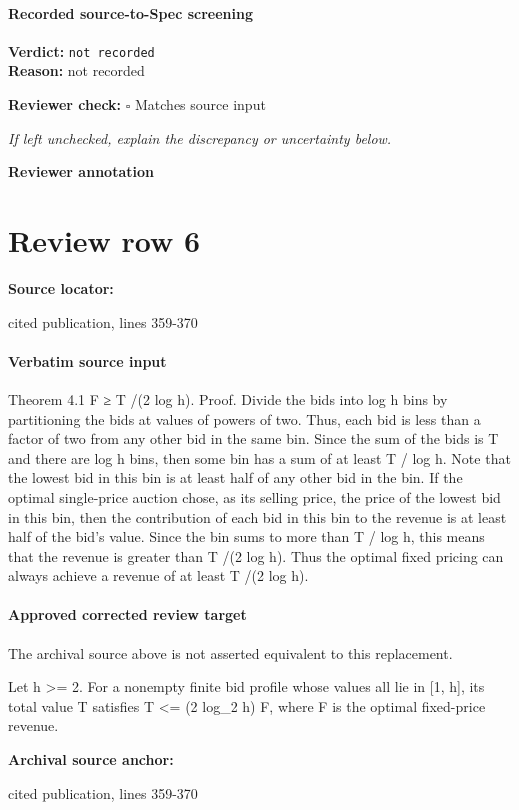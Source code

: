 \documentclass[10pt]{article}
\newcommand{\reviewerbox}{%
  \par\noindent\fbox{\parbox{0.96\linewidth}{\rule{0pt}{0.38in}}}\par
}
\newcommand{\reviewmatch}[1]{%
  \par\noindent\textbf{Reviewer check:} $\square$\; #1\par
  \noindent\emph{If left unchecked, explain the discrepancy or uncertainty below.}\par
}
\begin{document}
\paragraph{Recorded source-to-Spec screening}
\textbf{Verdict:} \texttt{not recorded}
\\
\textbf{Reason:} not recorded
\reviewmatch{Matches source input}
\noindent\textbf{Reviewer annotation}\par
\reviewerbox
\clearpage
\hypertarget{source-claim-2bea065aff29fbec}{}
\section*{Review row 6}
\textbf{Source locator:} {\footnotesize\raggedright cited publication, lines 359-\allowbreak{}370\par}
\paragraph{Verbatim source input}
\begin{ReviewVerbatim}
Theorem 4.1 F ≥ T /(2 log h).
Proof. Divide the bids into log h bins by partitioning the bids at values of powers of two. Thus, each
bid is less than a factor of two from any other bid
in the same bin. Since the sum of the bids is T and
there are log h bins, then some bin has a sum of at
least T / log h. Note that the lowest bid in this bin is
at least half of any other bid in the bin. If the optimal single-price auction chose, as its selling price, the
price of the lowest bid in this bin, then the contribution of each bid in this bin to the revenue is at least
half of the bid’s value. Since the bin sums to more
than T / log h, this means that the revenue is greater
than T /(2 log h). Thus the optimal fixed pricing can
always achieve a revenue of at least T /(2 log h).
\end{ReviewVerbatim}

\paragraph{Approved corrected review target}
The archival source above is not asserted equivalent to this replacement.
\begin{ReviewVerbatim}
Let h >= 2. For a nonempty finite bid profile whose values all lie in [1, h], its total value T satisfies T <= (2 log_2 h) F, where F is the optimal fixed-price revenue.
\end{ReviewVerbatim}

\textbf{Archival source anchor:} {\footnotesize\raggedright cited publication, lines 359-\allowbreak{}370\par}
\end{document}
